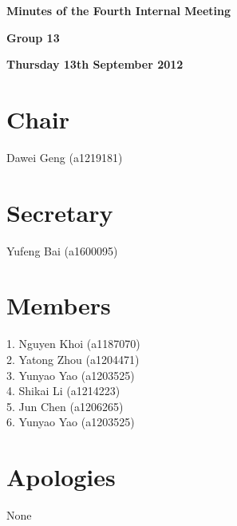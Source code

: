 \documentclass[11pt, a4paper]{article}
\begin{document}
 



\vspace*{15pt}

\begin{center}
\huge \bf Minutes of the Fourth Internal Meeting
\end{center}


\begin{center}
\Large \bf Group 13
\end{center}

\begin{center}
\Large \bf  Thursday 13th September 2012
\end{center}

\section*{Chair}
 Dawei Geng (a1219181)

\section*{Secretary}
Yufeng Bai (a1600095)

\section*{Members}
1. Nguyen Khoi (a1187070)\\
2. Yatong Zhou (a1204471)\\
3. Yunyao Yao (a1203525)\\
4. Shikai Li (a1214223)\\
5. Jun Chen (a1206265)\\
6. Yunyao Yao (a1203525)
\vspace*{10pt}

\section*{Apologies}
None
\end{document}
